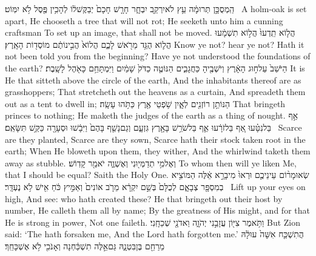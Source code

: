 {הַֽמְסֻכָּ֣ן תְּרוּמָ֔ה עֵ֥ץ לֹא\maqqaf יִרְקַ֖ב יִבְחָ֑ר חָרָ֤שׁ חָכָם֙ יְבַקֶּשׁ\maqqaf ל֔וֹ לְהָכִ֥ין פֶּ֖סֶל לֹ֥א יִמּֽוֹט׃ \setuma }
{A holm-oak is set apart, He chooseth a tree that will not rot; He seeketh unto him a cunning craftsman To set up an image, that shall not be moved.}
{הֲל֤וֹא תֵֽדְעוּ֙ הֲל֣וֹא תִשְׁמָ֔עוּ הֲל֛וֹא הֻגַּ֥ד מֵרֹ֖אשׁ לָכֶ֑ם הֲלוֹא֙ הֲבִ֣ינוֹתֶ֔ם מוֹסְד֖וֹת הָאָֽרֶץ׃}
{Know ye not? hear ye not? Hath it not been told you from the beginning? Have ye not understood the foundations of the earth?}
{הַיֹּשֵׁב֙ עַל\maqqaf ח֣וּג הָאָ֔רֶץ וְיֹשְׁבֶ֖יהָ כַּחֲגָבִ֑ים הַנּוֹטֶ֤ה כַדֹּק֙ שָׁמַ֔יִם וַיִּמְתָּחֵ֥ם כָּאֹ֖הֶל לָשָֽׁבֶת׃}
{It is He that sitteth above the circle of the earth, And the inhabitants thereof are as grasshoppers; That stretcheth out the heavens as a curtain, And spreadeth them out as a tent to dwell in;}
{הַנּוֹתֵ֥ן רוֹזְנִ֖ים לְאָ֑יִן שֹׁ֥פְטֵי אֶ֖רֶץ כַּתֹּ֥הוּ עָשָֽׂה׃}
{That bringeth princes to nothing; He maketh the judges of the earth as a thing of nought.}
{אַ֣ף בַּל\maqqaf נִטָּ֗עוּ אַ֚ף בַּל\maqqaf זֹרָ֔עוּ אַ֛ף בַּל\maqqaf שֹׁרֵ֥שׁ בָּאָ֖רֶץ גִּזְעָ֑ם וְגַם\maqqaf נָשַׁ֤ף בָּהֶם֙ וַיִּבָ֔שׁוּ וּסְעָרָ֖ה כַּקַּ֥שׁ תִּשָּׂאֵֽם׃ \setuma }
{Scarce are they planted, Scarce are they sown, Scarce hath their stock taken root in the earth; When He bloweth upon them, they wither, And the whirlwind taketh them away as stubble.}
{וְאֶל\maqqaf מִ֥י תְדַמְּי֖וּנִי וְאֶשְׁוֶ֑ה יֹאמַ֖ר קָדֽוֹשׁ׃}
{To whom then will ye liken Me, that I should be equal? Saith the Holy One.}
{שְׂאוּ\maqqaf מָר֨וֹם עֵינֵיכֶ֤ם וּרְאוּ֙ מִי\maqqaf בָרָ֣א אֵ֔לֶּה הַמּוֹצִ֥יא בְמִסְפָּ֖ר צְבָאָ֑ם לְכֻלָּם֙ בְּשֵׁ֣ם יִקְרָ֔א מֵרֹ֤ב אוֹנִים֙ וְאַמִּ֣יץ כֹּ֔חַ אִ֖ישׁ לֹ֥א נֶעְדָּֽר׃ \setuma }
{Lift up your eyes on high, And see: who hath created these? He that bringeth out their host by number, He calleth them all by name; By the greatness of His might, and for that He is strong in power, Not one faileth.}
\label{haft_46}
\setcounter{chap}{49}
\setcounter{verse}{14}
{וַתֹּ֥אמֶר צִיּ֖וֹן עֲזָבַ֣נִי יְהֹוָ֑ה וַאדֹנָ֖י שְׁכֵחָֽנִי׃}
{But Zion said: ‘The \lord\space hath forsaken me, And the Lord hath forgotten me.’}
{הֲתִשְׁכַּ֤ח אִשָּׁה֙ עוּלָ֔הּ מֵרַחֵ֖ם בֶּן\maqqaf בִּטְנָ֑הּ גַּם\maqqaf אֵ֣לֶּה תִשְׁכַּ֔חְנָה וְאָנֹכִ֖י לֹ֥א אֶשְׁכָּחֵֽךְ׃}
